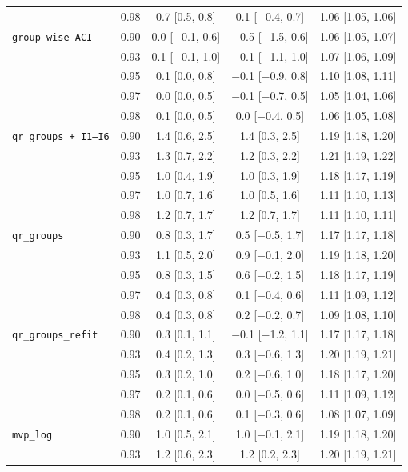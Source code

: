 \begin{tabular}{@{}llccc@{}}
 & 0.98 & 0.7 [0.5, 0.8] & 0.1 [$-$0.4, 0.7] & 1.06 [1.05, 1.06] \\
\addlinespace
\texttt{group-wise ACI} & 0.90 & 0.0 [$-$0.1, 0.6] & $-$0.5 [$-$1.5, 0.6] & 1.06 [1.05, 1.07] \\
 & 0.93 & 0.1 [$-$0.1, 1.0] & $-$0.1 [$-$1.1, 1.0] & 1.07 [1.06, 1.09] \\
 & 0.95 & 0.1 [0.0, 0.8] & $-$0.1 [$-$0.9, 0.8] & 1.10 [1.08, 1.11] \\
 & 0.97 & 0.0 [0.0, 0.5] & $-$0.1 [$-$0.7, 0.5] & 1.05 [1.04, 1.06] \\
 & 0.98 & 0.1 [0.0, 0.5] & 0.0 [$-$0.4, 0.5] & 1.06 [1.05, 1.08] \\
\addlinespace
\texttt{qr\_groups + I1--I6} & 0.90 & 1.4 [0.6, 2.5] & 1.4 [0.3, 2.5] & 1.19 [1.18, 1.20] \\
 & 0.93 & 1.3 [0.7, 2.2] & 1.2 [0.3, 2.2] & 1.21 [1.19, 1.22] \\
 & 0.95 & 1.0 [0.4, 1.9] & 1.0 [0.3, 1.9] & 1.18 [1.17, 1.19] \\
 & 0.97 & 1.0 [0.7, 1.6] & 1.0 [0.5, 1.6] & 1.11 [1.10, 1.13] \\
 & 0.98 & 1.2 [0.7, 1.7] & 1.2 [0.7, 1.7] & 1.11 [1.10, 1.11] \\
\addlinespace
\texttt{qr\_groups} & 0.90 & 0.8 [0.3, 1.7] & 0.5 [$-$0.5, 1.7] & 1.17 [1.17, 1.18] \\
 & 0.93 & 1.1 [0.5, 2.0] & 0.9 [$-$0.1, 2.0] & 1.19 [1.18, 1.20] \\
 & 0.95 & 0.8 [0.3, 1.5] & 0.6 [$-$0.2, 1.5] & 1.18 [1.17, 1.19] \\
 & 0.97 & 0.4 [0.3, 0.8] & 0.1 [$-$0.4, 0.6] & 1.11 [1.09, 1.12] \\
 & 0.98 & 0.4 [0.3, 0.8] & 0.2 [$-$0.2, 0.7] & 1.09 [1.08, 1.10] \\
\addlinespace
\texttt{qr\_groups\_refit} & 0.90 & 0.3 [0.1, 1.1] & $-$0.1 [$-$1.2, 1.1] & 1.17 [1.17, 1.18] \\
 & 0.93 & 0.4 [0.2, 1.3] & 0.3 [$-$0.6, 1.3] & 1.20 [1.19, 1.21] \\
 & 0.95 & 0.3 [0.2, 1.0] & 0.2 [$-$0.6, 1.0] & 1.18 [1.17, 1.20] \\
 & 0.97 & 0.2 [0.1, 0.6] & 0.0 [$-$0.5, 0.6] & 1.11 [1.09, 1.12] \\
 & 0.98 & 0.2 [0.1, 0.6] & 0.1 [$-$0.3, 0.6] & 1.08 [1.07, 1.09] \\
\addlinespace
\texttt{mvp\_log} & 0.90 & 1.0 [0.5, 2.1] & 1.0 [$-$0.1, 2.1] & 1.19 [1.18, 1.20] \\
 & 0.93 & 1.2 [0.6, 2.3] & 1.2 [0.2, 2.3] & 1.20 [1.19, 1.21] \\

\end{tabular}

